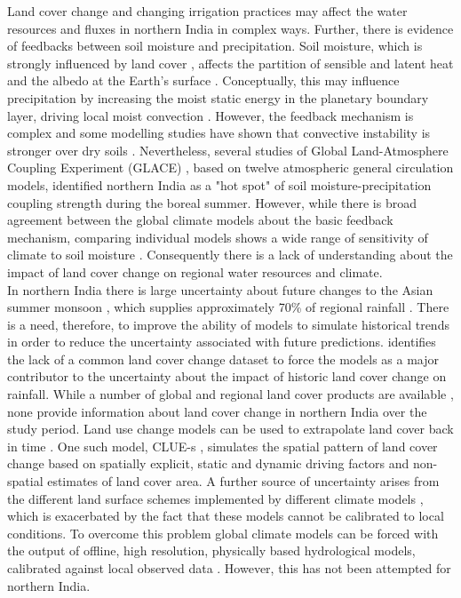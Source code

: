 \documentclass{icldt}\usepackage[]{graphicx}\usepackage[]{color}
\begin{document}
Land cover change and changing irrigation practices may affect the water resources and fluxes in northern India in complex ways. Further, there is evidence of feedbacks between soil moisture and precipitation. Soil moisture, which is strongly influenced by land cover \citep{Dirmeyer2006,Lawrence2007a}, affects the partition of sensible and latent heat and the albedo at the Earth's surface \citep{Meehl1994,Pitman2003,Seneviratne2010}. Conceptually, this may influence precipitation by increasing the moist static energy in the planetary boundary layer, driving local moist convection \citep[e.g.][]{Eltahir1998}. However, the feedback mechanism is complex and some modelling studies have shown that convective instability is stronger over dry soils \citep{Findell2003a,Findell2003b}. Nevertheless, several studies of Global Land-Atmosphere Coupling Experiment (GLACE) \citep{Koster2004,Koster2006,Guo2006}, based on twelve atmospheric general circulation models, identified northern India as a "hot spot" of soil moisture-precipitation coupling strength during the boreal summer. However, while there is broad agreement between the global climate models about the basic feedback mechanism, comparing individual models shows a wide range of sensitivity of climate to soil moisture \citep{Koster2004,Guo2006,Pitman2009}. Consequently there is a lack of understanding about the impact of land cover change on regional water resources and climate. \\ 

In northern India there is large uncertainty about future changes to the Asian summer monsoon \citep{Goswami2006,Turner2009}, which supplies approximately 70\% of regional rainfall \citep{Thenkabail2005}. There is a need, therefore, to improve the ability of models to simulate historical trends in order to reduce the uncertainty associated with future predictions. \citet{Pitman2009} identifies the lack of a common land cover change dataset to force the models as a major contributor to the uncertainty about the impact of historic land cover change on rainfall. While a number of global and regional land cover products are available \citep[e.g.][]{Hansen2000,Loveland2000,Friedl2002}, none provide information about land cover change in northern India over the study period. Land use change models can be used to extrapolate land cover back in time \citep{Verburg2002}. One such model, CLUE-s \citep{Verburg2002,Verburg2004}, simulates the spatial pattern of land cover change based on spatially explicit, static and dynamic driving factors and non-spatial estimates of land cover area. A further source of uncertainty arises from the different land surface schemes implemented by different climate models \citep{Henderson1996,Pitman2009}, which is exacerbated by the fact that these models cannot be calibrated to local conditions. To overcome this problem global climate models can be forced with the output of offline, high resolution, physically based hydrological models, calibrated against local observed data \citep{Seneviratne2010}. However, this has not been attempted for northern India. \\
\end{document}
